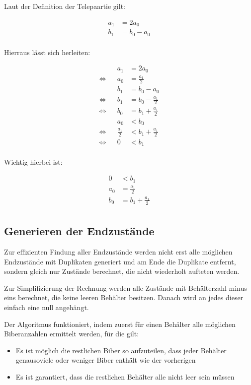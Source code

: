 \documentclass[a4paper,10pt,ngerman]{scrartcl}
\begin{document}
Laut der Definition der Telepaartie gilt:

\begin{align*}
    a_1 &= 2 a_0 \\
    b_1 &= b_0 - a_0 \\
\end{align*}

Hierraus lässt sich herleiten:

\begin{align*}
    && a_1 &= 2 a_0 \\
    \iff&& a_0 &= \frac{a_1}{2} \\
    && b_1 &= b_0 - a_0 \\
    \iff&& b_1 &= b_0 - \frac{a_1}{2} \\
    \iff&& b_0 &= b_1 + \frac{a_1}{2} \\
    && a_0 &< b_0 \\
    \iff&& \frac{a_1}{2} &< b_1 + \frac{a_1}{2} \\
    \iff&& 0 &< b_1 \\
\end{align*}

Wichtig hierbei ist:

\begin{align*}
    0 &< b_1 \\
    a_0 &= \frac{a_1}{2} \\
    b_0 &= b_1 + \frac{a_1}{2} \\
\end{align*}

\subsection{Generieren der Endzustände} \label{alg:target}

Zur effizienten Findung aller Endzustände werden nicht erst alle möglichen Endzustände mit Duplikaten generiert und am Ende die Duplikate entfernt, sondern gleich nur Zustände berechnet, die nicht wiederholt aufteten werden.

Zur Simplifizierung der Rechnung werden alle Zustände mit Behälterzahl minus eins berechnet, die keine leeren Behälter besitzen. Danach wird an jedes dieser einfach eine null angehängt.

Der Algoritmus funktioniert, indem zuerst für einen Behälter alle möglichen Biberanzahlen ermittelt werden, für die gilt:

\begin{itemize}
    \item Es ist möglich die restlichen Biber so aufzuteilen, dass jeder Behälter genausoviele oder weniger Biber enthält wie der vorherigen
    \item Es ist garantiert, dass die restlichen Behälter alle nicht leer sein müssen 
\end{itemize}
\end{document}
